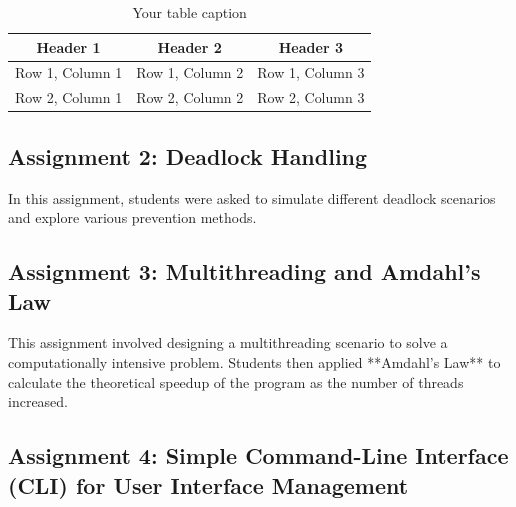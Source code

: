 \documentclass[12pt]{article}
\begin{document}
\begin{table}[htbp] %
    \centering
    \begin{tabular}{|c|c|c|} %
    \hline
    Header 1 & Header 2 & Header 3 \\ %
    \hline
    Row 1, Column 1 & Row 1, Column 2 & Row 1, Column 3 \\ %
    \hline
    Row 2, Column 1 & Row 2, Column 2 & Row 2, Column 3 \\ %
    \hline
    \end{tabular}
    \caption{Your table caption} %
    \label{tab:your_label} %
\end{table}
\subsection{Assignment 2: Deadlock Handling}
In this assignment, students were asked to simulate different deadlock scenarios and explore various prevention methods.

\subsection{Assignment 3: Multithreading and Amdahl's Law}
This assignment involved designing a multithreading scenario to solve a computationally intensive problem. Students then applied **Amdahl's Law** to calculate the theoretical speedup of the program as the number of threads increased.

\subsection{Assignment 4: Simple Command-Line Interface
(CLI) for User Interface Management}
\end{document}

